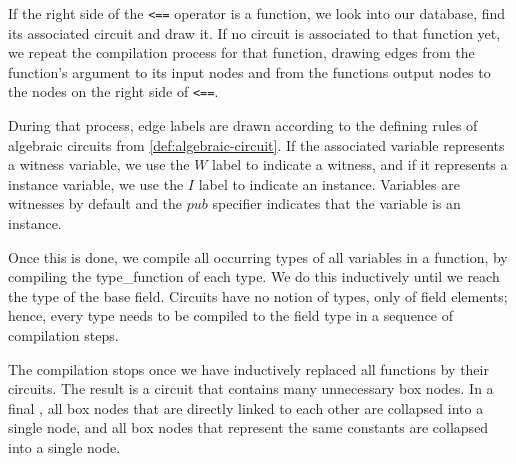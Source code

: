 If the right side of the \texttt{<==} operator is a function, we look into our database, find its associated circuit and draw it. If no circuit is  associated to that function yet, we repeat the compilation process for that function, drawing edges from the function's argument to its input nodes and from the functions output nodes to the nodes on the right side of \texttt{<==}.

During that process, edge labels are drawn according to the defining rules of algebraic circuits from \ref{def:algebraic-circuit}. If the associated variable represents a witness variable, we use the $W$ label to indicate a witness, and if it represents a instance variable, we use the $I$ label to indicate an instance. Variables are witnesses by default and the $pub$ specifier indicates that the variable is an instance.

Once this is done, we compile all occurring types of all variables in a function, by compiling the type\_function of each type. We do this inductively until we reach the type of the base field. Circuits have no notion of types, only of field elements; hence, every type needs to be compiled to the field type in a sequence of compilation steps.

The compilation stops once we have inductively replaced all functions by their circuits. The result is a circuit that contains many unnecessary box nodes. In a final , all box nodes that are directly linked to each other are collapsed into a single node, and all box nodes that represent the same constants are collapsed into a single node. 

